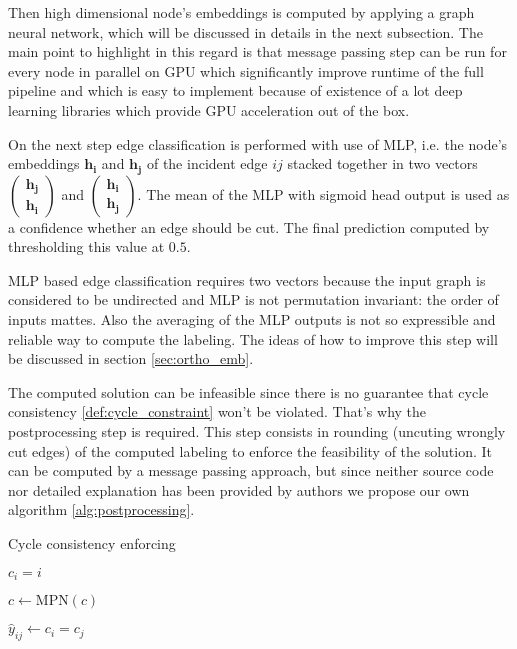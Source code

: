 \documentclass[10pt, twocolumn, a4paper]{article}
\theoremstyle{definition}
\begin{document}
Then high dimensional node's embeddings is computed by applying a graph neural network, which will be
discussed in details in the next subsection. The main point to highlight in this regard is that
message passing step  can be run for every node in parallel on GPU which significantly improve runtime of the
full pipeline and which is easy to implement because of existence of a lot deep learning libraries
which provide GPU acceleration out of the box.

On the next step edge classification is performed with use of MLP, i.e. the node's embeddings $\mathbf{h_i}$ and
$\mathbf{h_j}$ of the incident edge $ij$ stacked together in two vectors
$\left( \substack{\mathbf{h_j} \\ \mathbf{h_i}} \right)$ and
$\left( \substack{\mathbf{h_i} \\ \mathbf{h_j}} \right)$. The mean of the MLP with sigmoid head
output is used as a confidence whether an edge should be cut. The final prediction computed by thresholding
this value at $0.5$.

MLP based edge classification requires two vectors because the input graph is considered to be undirected and
MLP is not permutation invariant: the order of inputs
mattes. Also the averaging of the MLP outputs is not so expressible and reliable way to compute the labeling.
The ideas of how to improve this step will be discussed in section \ref{sec:ortho_emb}.

The computed solution can be infeasible since there is no guarantee that cycle consistency \eqref{def:cycle_constraint} won't be
violated. That's why the postprocessing step is required. This step consists in rounding (uncuting wrongly cut edges) of the computed
labeling to enforce the feasibility of the solution. It can be computed by a message passing approach, but since
neither source code nor detailed explanation has been provided by authors we propose our own algorithm \ref{alg:postprocessing}.

\begin{algorithm}[h]
    \caption{Cycle consistency enforcing} \label{alg:postprocessing}

    {
        $c_i = i$ 
    }

    {
        $c \gets \text{MPN}(c)$ 
    }

    {
        $\hat{y}_{ij} \gets c_i = c_j$ \;
    }

\end{algorithm}
\end{document}
